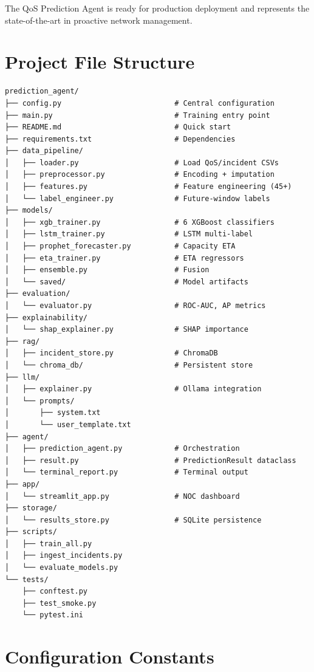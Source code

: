 \documentclass[11pt,a4paper,oneside]{report}
\begin{document}
The QoS Prediction Agent is ready for production deployment and represents the state-of-the-art in proactive network management.
\newpage
\appendix
\chapter{Project File Structure}

\begin{verbatim}
prediction_agent/
├── config.py                          # Central configuration
├── main.py                            # Training entry point
├── README.md                          # Quick start
├── requirements.txt                   # Dependencies
├── data_pipeline/
│   ├── loader.py                      # Load QoS/incident CSVs
│   ├── preprocessor.py                # Encoding + imputation
│   ├── features.py                    # Feature engineering (45+)
│   └── label_engineer.py              # Future-window labels
├── models/
│   ├── xgb_trainer.py                 # 6 XGBoost classifiers
│   ├── lstm_trainer.py                # LSTM multi-label
│   ├── prophet_forecaster.py          # Capacity ETA
│   ├── eta_trainer.py                 # ETA regressors
│   ├── ensemble.py                    # Fusion
│   └── saved/                         # Model artifacts
├── evaluation/
│   └── evaluator.py                   # ROC-AUC, AP metrics
├── explainability/
│   └── shap_explainer.py              # SHAP importance
├── rag/
│   ├── incident_store.py              # ChromaDB
│   └── chroma_db/                     # Persistent store
├── llm/
│   ├── explainer.py                   # Ollama integration
│   └── prompts/
│       ├── system.txt
│       └── user_template.txt
├── agent/
│   ├── prediction_agent.py            # Orchestration
│   ├── result.py                      # PredictionResult dataclass
│   └── terminal_report.py             # Terminal output
├── app/
│   └── streamlit_app.py               # NOC dashboard
├── storage/
│   └── results_store.py               # SQLite persistence
├── scripts/
│   ├── train_all.py
│   ├── ingest_incidents.py
│   └── evaluate_models.py
└── tests/
    ├── conftest.py
    ├── test_smoke.py
    └── pytest.ini
\end{verbatim}

\chapter{Configuration Constants}
\end{document}
